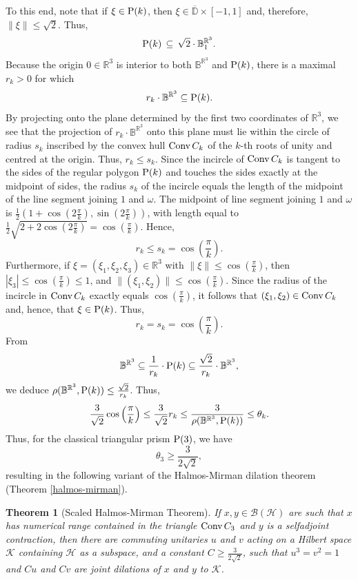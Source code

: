 \documentclass{amsart}
\newtheorem{theorem}{Theorem}[section]
\theoremstyle{definition}
\theoremstyle{remark}
\newcommand{\B}{\mathcal{B}}
\renewcommand{\H}{\mathcal{H}}
\newcommand{\K}{\mathcal K}
\numberwithin{equation}{section}
\begin{document}
To this end, note that if $\xi\in\mbox{\textrm P}(k)$, then $\xi\in \overline{\mathbb D}\times[-1,1]$ and, therefore, 
$\|\xi\|\leq\sqrt{2}$. Thus,
\[
\mbox{\textrm P}(k) \,\subseteq\,\sqrt{2} \cdot \mathbb B_1^{\mathbb R^3}.
\]
Because the origin $0\in\mathbb R^3$ is interior to both $\mathbb B^{\mathbb R^3}$ and $\mbox{\textrm P}(k)$,
there is a maximal $r_k>0$ for which
\[
r_k\cdot \mathbb B^{\mathbb R^3} \subseteq \mbox{\textrm P}(k).
\]
By projecting onto the plane determined by the first two coordinates of $\mathbb R^3$, 
we see that the projection of $r_k\cdot \mathbb B^{\mathbb R^3}$
onto this plane must lie within the circle of radius $s_k$ inscribed by the convex hull 
$\mbox{\textrm Conv}\,C_k$ of the $k$-th roots of unity and centred at the origin. Thus, $r_k\leq s_k$. 
Since the incircle of $\mbox{\textrm Conv}\,C_k$ is tangent to the sides of the regular polygon $\mbox{\textrm P}(k)$
and touches the sides exactly at the midpoint of sides, 
the radius $s_k$ of the incircle equals the length of the midpoint of the line segment 
joining $1$ and $\omega$.
The midpoint of line segment 
joining $1$ and $\omega$ is $\frac{1}{2}(1+\cos(2\frac{\pi}{k}),\sin(2\frac{\pi}{k}))$, with length equal to $\frac{1}{2}\sqrt{2+2\cos(2\frac{\pi}{k})}
=\cos(\frac{\pi}{k})$.
Hence, 
\[
r_k\leq s_k=\cos\left(\frac{\pi}{k}\right).
\] 
Furthermore, if $\xi=(\xi_1,\xi_2,\xi_3)\in \mathbb R^3$ with $\|\xi\|\leq \cos\left(\frac{\pi}{k}\right)$, 
then $|\xi_3|\leq \cos\left(\frac{\pi}{k}\right)\leq 1$, and $\|(\xi_1,\xi_2)\|\leq \cos\left(\frac{\pi}{k}\right)$. 
Since the radius of the incircle in $\mbox{\textrm Conv}\,C_k$ exactly equals $\cos\left(\frac{\pi}{k}\right)$, 
it follows that $(\xi_1,\xi_2)\in \mbox{\textrm Conv}\,C_k$ and, hence, that $\xi\in \mbox{\textrm P}(k)$. Thus,   
\[
r_k=s_k=\cos\left(\frac{\pi}{k}\right).
\]
From
\[
\mathbb B^{\mathbb R^3} \subseteq \frac{1}{r_k}\cdot \mbox{\textrm P}(k) \subseteq \frac{\sqrt{2}}{r_k}\cdot \mathbb B^{\mathbb R^3},
\]
we deduce $\rho(\mathbb B^{\mathbb R^3},\mbox{\textrm P}(k))\leq \frac{\sqrt{2}}{r_k}$. Thus,
\[
\frac{3}{\sqrt{2}}\cos\left(\frac{\pi}{k}\right) \leq \frac{3}{\sqrt{2}}r_k 
\leq \frac{3}{\rho(\mathbb B^{\mathbb R^3},\mbox{\textrm P}(k))}\leq \theta_k.
\]
Thus, for the classical triangular prism $\mbox{\textrm P}(3)$, we have 
\[
\theta_3\geq \frac{3}{2\sqrt{2}},
\]
resulting in the following variant of the Halmos-Mirman dilation theorem (Theorem \ref{halmos-mirman}).

\begin{theorem}[Scaled Halmos-Mirman Theorem] 
If $x,y\in\B(\H)$ are such that $x$ has numerical range contained in the triangle $\mbox{\textrm Conv}\,C_3$
and $y$ is a selfadjoint contraction, then there are commuting unitaries $u$ and $v$ acting on a 
Hilbert space $\K$ containing $\H$ as a subspace, and a constant
$C\geq \frac{3}{2\sqrt{2}}$, such that $u^3=v^2=1$  and
$Cu$ and $Cv$ are joint dilations of $x$ and $y$ to $\K$. 
\end{theorem}
 
\end{document}
